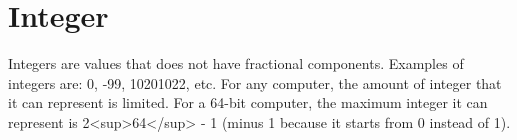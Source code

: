 \documentclass[../main.tex]{subfiles}
\begin{document}
    \section{Integer}
Integers are values that does not have fractional components. Examples of
integers are: 0, -99, 10201022, etc. For any computer, the amount of integer
that it can represent is limited. For a 64-bit computer, the maximum integer it
can represent is 2<sup>64</sup> - 1 (minus 1 because it starts from 0 instead of 1).
\end{document}
